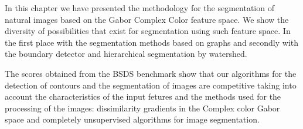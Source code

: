 In this chapter we have presented the methodology for the segmentation of natural images based on the Gabor Complex Color feature space. We show the diversity of possibilities that exist for segmentation using such feature space. In the first place with the segmentation methods based on graphs and secondly with the boundary detector and hierarchical segmentation by watershed.

The scores obtained from the BSDS benchmark show that our algorithms for the detection of contours and the segmentation of images are competitive taking into account the characteristics of the input fetures and the methods used for the processing of the images: dissimilarity gradients in the Complex color Gabor space and completely unsupervised algorithms for image segmentation.

